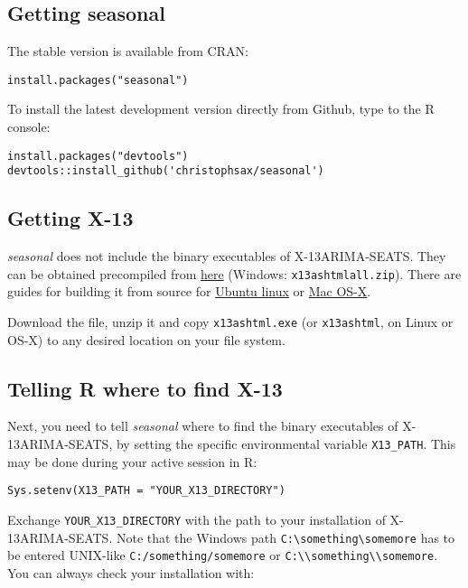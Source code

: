 \subsection{Getting seasonal}\label{getting-seasonal}

The stable version is available from CRAN:

\begin{verbatim}
install.packages("seasonal")
\end{verbatim}

To install the latest development version directly from Github, type to
the R console:

\begin{verbatim}
install.packages("devtools")       
devtools::install_github('christophsax/seasonal')      
\end{verbatim}

\subsection{Getting X-13}\label{getting-x-13}

\emph{seasonal} does not include the binary executables of
X-13ARIMA-SEATS. They can be obtained precompiled from
\href{http://www.census.gov/srd/www/x13as/x13down_pc.html}{here}
(Windows: \texttt{x13ashtmlall.zip}). There are guides for building it
from source for
\href{https://github.com/christophsax/seasonal/wiki/Compiling-X-13ARIMA-SEATS-from-Source-for-Ubuntu}{Ubuntu
linux} or
\href{https://github.com/christophsax/seasonal/wiki/Compiling-X-13ARIMA-SEATS-from-Source-for-OS-X}{Mac
OS-X}.

Download the file, unzip it and copy \texttt{x13ashtml.exe} (or
\texttt{x13ashtml}, on Linux or OS-X) to any desired location on your
file system.

\subsection{Telling R where to find
X-13}\label{telling-r-where-to-find-x-13}

Next, you need to tell \emph{seasonal} where to find the binary
executables of X-13ARIMA-SEATS, by setting the specific environmental
variable \texttt{X13\_PATH}. This may be done during your active session
in R:

\begin{verbatim}
Sys.setenv(X13_PATH = "YOUR_X13_DIRECTORY")
\end{verbatim}

Exchange \texttt{YOUR\_X13\_DIRECTORY} with the path to your
installation of X-13ARIMA-SEATS. Note that the Windows path
\texttt{C:\textbackslash{}something\textbackslash{}somemore} has to be
entered UNIX-like \texttt{C:/something/somemore} or
\texttt{C:\textbackslash{}\textbackslash{}something\textbackslash{}\textbackslash{}somemore}.
You can always check your installation with:

